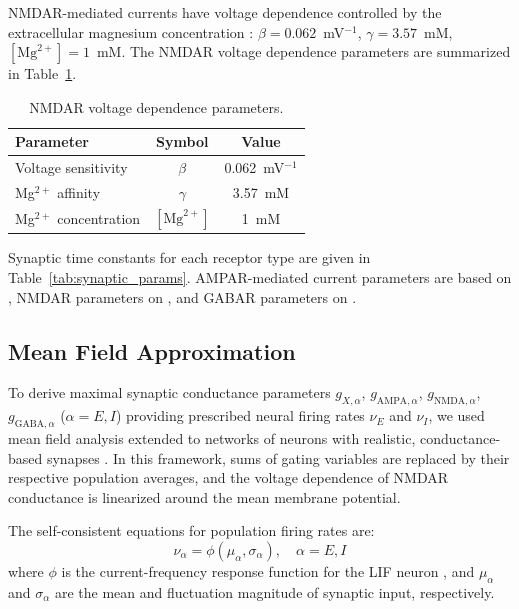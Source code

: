 \documentclass[12pt]{article}
\begin{document}
NMDAR-mediated currents have voltage dependence controlled by the extracellular magnesium concentration \citep{JahrStevens1990}: $\beta = 0.062$~mV$^{-1}$, $\gamma = 3.57$~mM, $[\text{Mg}^{2+}] = 1$~mM. The NMDAR voltage dependence parameters are summarized in Table~\ref{tab:nmda_params}.

\begin{table}[htbp]
\centering
\caption{NMDAR voltage dependence parameters.}
\label{tab:nmda_params}
\begin{tabular}{lcc}
\toprule
\textbf{Parameter} & \textbf{Symbol} & \textbf{Value} \\
\midrule
Voltage sensitivity & $\beta$ & 0.062~mV$^{-1}$ \\
Mg$^{2+}$ affinity & $\gamma$ & 3.57~mM \\
Mg$^{2+}$ concentration & $[\text{Mg}^{2+}]$ & 1~mM \\
\bottomrule
\end{tabular}
\end{table}

Synaptic time constants for each receptor type are given in Table~\ref{tab:synaptic_params}. AMPAR-mediated current parameters are based on \citet{ZhouHablitz1998}, NMDAR parameters on \citet{Hestrin1990}, and GABAR parameters on \citet{Gupta2000}.

\subsection{Mean Field Approximation}

To derive maximal synaptic conductance parameters $g_{X,\alpha}$, $g_{\text{AMPA},\alpha}$, $g_{\text{NMDA},\alpha}$, $g_{\text{GABA},\alpha}$ ($\alpha = E, I$) providing prescribed neural firing rates $\nu_E$ and $\nu_I$, we used mean field analysis \citep{AmitBrunel1997, Brunel2000, vanVreeswijk1996} extended to networks of neurons with realistic, conductance-based synapses \citep{BrunelWang2001, Renart2003}. In this framework, sums of gating variables are replaced by their respective population averages, and the voltage dependence of NMDAR conductance is linearized around the mean membrane potential.

The self-consistent equations for population firing rates are:
\begin{equation}
\nu_\alpha = \phi(\mu_\alpha, \sigma_\alpha), \quad \alpha = E, I
\end{equation}
where $\phi$ is the current-frequency response function for the LIF neuron \citep{BrunelSergi1998, FourcaudBrunel2002}, and $\mu_\alpha$ and $\sigma_\alpha$ are the mean and fluctuation magnitude of synaptic input, respectively.
\end{document}

